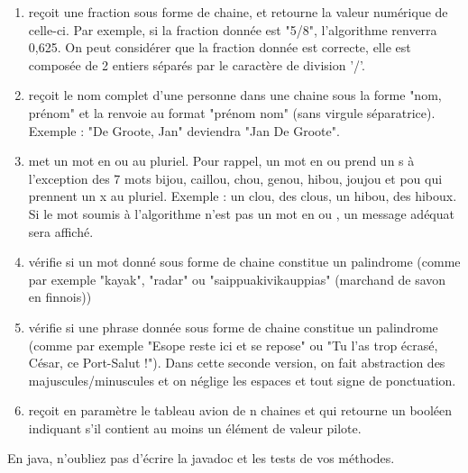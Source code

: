 \documentclass[11pt,a4paper]{article}
\begin{document}
					\begin{enumerate}
				
			\item  re\c coit une fraction sous forme de chaine, et retourne la valeur
              num\'erique de celle-ci. Par exemple, si la fraction donn\'ee est "5/8", l'algorithme renverra
              0,625. On peut consid\'erer que la fraction donn\'ee est correcte, elle est compos\'ee de 2 entiers
              s\'epar\'es par le caract\`ere de division '/'.
            
			\item 
              re\c coit le nom complet d'une personne dans une chaine sous la forme
              "nom, pr\'enom" et la renvoie au format "pr\'enom nom" (sans virgule s\'eparatrice). Exemple :
              "De Groote, Jan" deviendra "Jan De Groote".
            
			\item 
              met un mot en \guillemotleft  ou \guillemotright  au pluriel. Pour rappel, un mot en \guillemotleft  ou \guillemotright 
              prend un \guillemotleft  s \guillemotright  \`a l'exception des 7 mots bijou, caillou, chou, genou, hibou, joujou et pou qui
              prennent un \guillemotleft  x \guillemotright  au pluriel. Exemple : un clou, des clous, un hibou, des hiboux. Si le mot
              soumis \`a l'algorithme n'est pas un mot en \guillemotleft  ou \guillemotright , un message ad\'equat sera affich\'e.
              
			\item 
              v\'erifie si un mot donn\'e sous forme de chaine constitue un
              palindrome (comme par exemple "kayak", "radar" ou "saippuakivikauppias" (marchand
              de savon en finnois))
            
			\item 
              v\'erifie si une phrase donn\'ee sous forme de chaine constitue
              un palindrome (comme par exemple "Esope reste ici et se repose" ou "Tu l'as trop
              \'ecras\'e, C\'esar, ce Port-Salut !"). Dans cette seconde version, on fait abstraction des
              majuscules/minuscules et on n\'eglige les espaces et tout signe de ponctuation.
            
			\item 
              re\c coit en param\`etre le tableau avion de n chaines et qui retourne un
              bool\'een indiquant s'il contient au moins un \'el\'ement de valeur \guillemotleft pilote\guillemotright .
            
					\end{enumerate}
				
            \par
        En java, n'oubliez pas d'\'ecrire la javadoc et les tests de vos m\'ethodes.
            \par
        
				
\end{document}
